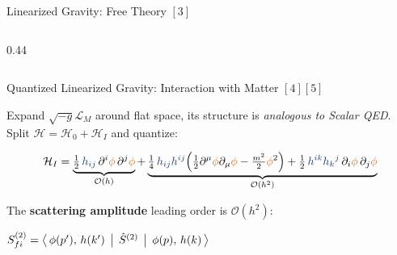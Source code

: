 \documentclass[aspectratio=169]{beamer}
\begin{document}
\begin{frame}[c]{Linearized Gravity: Free Theory $[3]$}
\begin{columns}[c, totalwidth=\textwidth]
\begin{column}{0.44\textwidth}

\end{column}
\end{columns}

\end{frame}




\begin{frame}{Quantized Linearized Gravity: Interaction with Matter $[4][5]$}

  \small Expand $\sqrt{-g}\mathcal{L}_M$ around flat space, its structure is \textit{analogous to Scalar QED}. 
Split $\mathcal{H} = \mathcal{H}_0 + \mathcal{H}_I$ and quantize:

\[
\mathcal{H}_I =
\underbrace{%
  \tfrac{1}{2}\,\textcolor{graviton}{h_{ij}}\,\partial^i\textcolor{matter}{\phi}\,\partial^j\textcolor{matter}{\phi}
}_{\mathcal{O}(h)}
+
\underbrace{%
  \tfrac{1}{4}\,\textcolor{graviton}{h_{ij}}\textcolor{graviton}{h^{ij}}
  \!\left(\tfrac{1}{2}\partial^\mu\textcolor{matter}{\phi}\partial_\mu\textcolor{matter}{\phi}
         - \tfrac{m^2}{2}\textcolor{matter}{\phi}^2\right)
  + \tfrac{1}{2}\,\textcolor{graviton}{h^{ik}}\textcolor{graviton}{h_k{}^j}\,
    \partial_i\textcolor{matter}{\phi}\,\partial_j\textcolor{matter}{\phi}
}_{\mathcal{O}(h^2)}
\]


\vspace{0.4cm}

The \textbf{scattering amplitude} leading order is $\mathcal{O}(h^2)$:

\begin{center}
\large
\textcolor{graviton}
{$S_{fi}^{(2)} = \bigl\langle\,
  \phi(p'),\, h(k')\,
  \bigm|\,\hat{S}^{(2)}\,\bigm|\,
  \phi(p),\, h(k)
\,\bigr\rangle$\\
}\end{center}


\end{frame}
\end{document}
